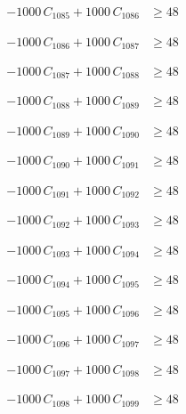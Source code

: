 \documentclass[a4paper,11pt]{article}
\begin{document}
\begin{align}
-1000\,C_{1085} + 1000\,C_{1086} &\geq 48 \nonumber
\end{align}

\begin{align}
-1000\,C_{1086} + 1000\,C_{1087} &\geq 48 \nonumber
\end{align}

\begin{align}
-1000\,C_{1087} + 1000\,C_{1088} &\geq 48 \nonumber
\end{align}

\begin{align}
-1000\,C_{1088} + 1000\,C_{1089} &\geq 48 \nonumber
\end{align}

\begin{align}
-1000\,C_{1089} + 1000\,C_{1090} &\geq 48 \nonumber
\end{align}

\begin{align}
-1000\,C_{1090} + 1000\,C_{1091} &\geq 48 \nonumber
\end{align}

\begin{align}
-1000\,C_{1091} + 1000\,C_{1092} &\geq 48 \nonumber
\end{align}

\begin{align}
-1000\,C_{1092} + 1000\,C_{1093} &\geq 48 \nonumber
\end{align}

\begin{align}
-1000\,C_{1093} + 1000\,C_{1094} &\geq 48 \nonumber
\end{align}

\begin{align}
-1000\,C_{1094} + 1000\,C_{1095} &\geq 48 \nonumber
\end{align}

\begin{align}
-1000\,C_{1095} + 1000\,C_{1096} &\geq 48 \nonumber
\end{align}

\begin{align}
-1000\,C_{1096} + 1000\,C_{1097} &\geq 48 \nonumber
\end{align}

\begin{align}
-1000\,C_{1097} + 1000\,C_{1098} &\geq 48 \nonumber
\end{align}

\begin{align}
-1000\,C_{1098} + 1000\,C_{1099} &\geq 48 \nonumber
\end{align}
\end{document}
